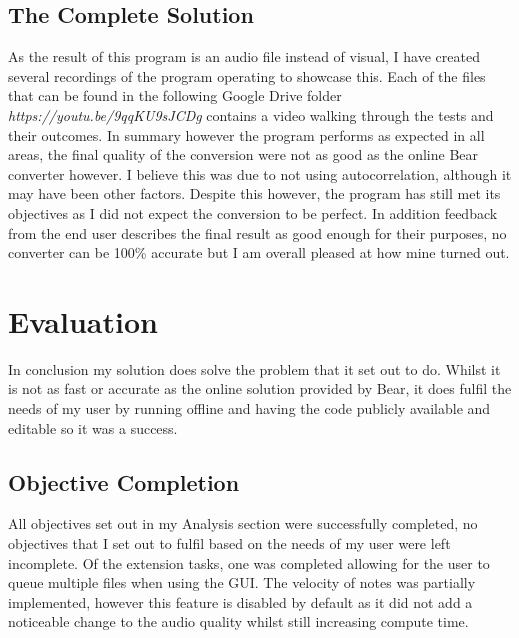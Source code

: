 \documentclass[12pt]{report}
\begin{document}
\subsection*{The Complete Solution}
As the result of this program is an audio file instead of visual, I have created several recordings of the program operating to showcase this. Each of the files that can be found in the following Google Drive folder \textit{https://youtu.be/9qqKU9sJCDg} contains a video walking through the tests and their outcomes. In summary however the program performs as expected in all areas, the final quality of the conversion were not as good as the online Bear converter however. I believe this was due to not using autocorrelation, although it may have been other factors. Despite this however, the program has still met its objectives as I did not expect the conversion to be perfect. In addition feedback from the end user describes the final result as good enough for their purposes, no converter can be 100\% accurate but I am overall pleased at how mine turned out.

\section*{Evaluation}
In conclusion my solution does solve the problem that it set out to do. Whilst it is not as fast or accurate as the online solution provided by Bear, it does fulfil the needs of my user by running offline and having the code publicly available and editable so it was a success.

\subsection*{Objective Completion}
All objectives set out in my Analysis section were successfully completed, no objectives that I set out to fulfil based on the needs of my user were left incomplete. Of the extension tasks, one was completed allowing for the user to queue multiple files when using the GUI. The velocity of notes was partially implemented, however this feature is disabled by default as it did not add a noticeable change to the audio quality whilst still increasing compute time.
\end{document}
